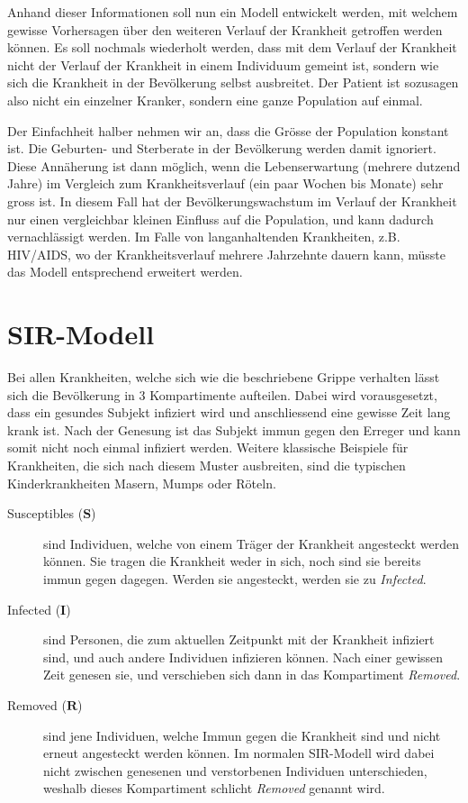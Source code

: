 \begin{refsection}
Anhand dieser Informationen soll nun ein Modell entwickelt werden, mit welchem gewisse Vorhersagen über den weiteren Verlauf der Krankheit getroffen werden können. 
Es soll nochmals wiederholt werden, dass mit dem Verlauf der Krankheit nicht der Verlauf der Krankheit in einem Individuum gemeint ist, sondern wie sich die Krankheit in der Bevölkerung selbst ausbreitet. 
Der Patient ist sozusagen also nicht ein einzelner Kranker, sondern eine ganze Population auf einmal.

Der Einfachheit halber nehmen wir an, dass die Grösse der Population konstant ist.
Die Geburten- und Sterberate in der Bevölkerung werden damit ignoriert.
Diese Annäherung ist dann möglich, wenn die Lebenserwartung (mehrere dutzend Jahre) im Vergleich zum Krankheitsverlauf (ein paar Wochen bis Monate) sehr gross ist.
In diesem Fall hat der Bevölkerungswachstum im Verlauf der Krankheit nur einen vergleichbar kleinen Einfluss auf die Population, und kann dadurch vernachlässigt werden.
Im Falle von langanhaltenden Krankheiten, z.B. HIV/AIDS, wo der Krankheitsverlauf mehrere Jahrzehnte dauern kann, müsste das Modell entsprechend erweitert werden.

\section{SIR-Modell}
Bei allen Krankheiten, welche sich wie die beschriebene Grippe verhalten lässt sich die Bevölkerung in 3 Kompartimente aufteilen. Dabei wird vorausgesetzt, dass ein gesundes Subjekt infiziert wird und anschliessend eine gewisse Zeit lang krank ist. Nach der Genesung ist das Subjekt immun gegen den Erreger und kann somit nicht noch einmal infiziert werden. Weitere klassische Beispiele für Krankheiten, die sich nach diesem Muster ausbreiten, sind die typischen Kinderkrankheiten Masern, Mumps oder Röteln.
\begin{description}
  \item [Susceptibles ($\mathbf{S}$)] sind Individuen, welche von einem Träger der Krankheit angesteckt werden können. Sie tragen die Krankheit weder in sich, noch sind sie bereits immun gegen dagegen. Werden sie angesteckt, werden sie zu \emph{Infected}.
  \item [Infected ($\mathbf{I}$)] sind Personen, die zum aktuellen Zeitpunkt mit der Krankheit infiziert sind, und auch andere Individuen infizieren können. Nach einer gewissen Zeit genesen sie, und verschieben sich dann in das Kompartiment \emph{Removed}.
  \item [Removed ($\mathbf{R}$)] sind jene Individuen, welche Immun gegen die Krankheit sind und nicht erneut angesteckt werden können. Im normalen SIR-Modell wird dabei nicht zwischen genesenen und verstorbenen Individuen unterschieden, weshalb dieses Kompartiment schlicht \emph{Removed} genannt wird.
\end{description}


\end{refsection}
